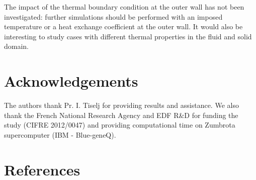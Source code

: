 \documentclass[review]{elsarticle}
\begin{document}
The impact of the thermal boundary condition at the outer wall has not been investigated: further simulations should be performed with an imposed temperature or a heat exchange coefficient at the outer wall.
It would also be interesting to study cases with different thermal properties in the fluid and solid domain.

\section{Acknowledgements}

The authors thank Pr. I. Tiselj for providing results and assistance. We also thank the French National Research Agency and EDF R\&D for funding the study (CIFRE 2012/0047) and providing computational time on Zumbrota supercomputer (IBM - Blue-geneQ).


\section*{References}


\end{document}
